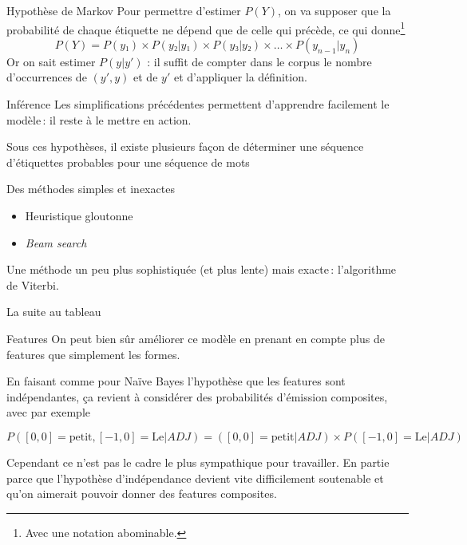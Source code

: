 \documentclass[hyperref={unicode}, xcolor={svgnames}, french]{beamer}
\begin{document}

\begin{frame}{Hypothèse de Markov}
	Pour permettre d'estimer $P(Y)$, on va supposer que la probabilité de chaque étiquette ne dépend que de celle qui précède, ce qui donne\footnote{Avec une notation abominable.}
	\begin{equation}
		P(Y) = P(y₁)×P(y₂|y₁)×P(y₃|y₂)×…×P(y_{n-1}|y_n)
	\end{equation}
	Or on sait estimer $P(y|y')$ : il suffit de compter dans le corpus le nombre d'occurrences de $(y',y)$ et de $y'$ et d'appliquer la définition.
\end{frame}

\begin{frame}{Inférence}
	Les simplifications précédentes permettent d'apprendre facilement le modèle : il reste à le mettre en action.

	Sous ces hypothèses, il existe plusieurs façon de déterminer une séquence d'étiquettes probables pour une séquence de mots

	Des méthodes simples et inexactes
	\begin{itemize}
		\item Heuristique gloutonne
		\item \emph{Beam search}
	\end{itemize}

	Une méthode un peu plus sophistiquée (et plus lente) mais exacte : l'algorithme de Viterbi.
\end{frame}

\begin{frame}[standout]
	La suite au tableau
\end{frame}

\begin{frame}{Features}
	On peut bien sûr améliorer ce modèle en prenant en compte plus de features que simplement les formes.

	En faisant comme pour Naïve Bayes l'hypothèse que les features sont indépendantes, ça revient à considérer des probabilités d'émission composites, avec par exemple

	\begin{equation}
		P([0,0]=\text{petit}, [-1,0]=\text{Le}|ADJ) = ([0,0]=\text{petit}|ADJ)×P([-1,0]=\text{Le}|ADJ)
	\end{equation}

	Cependant ce n'est pas le cadre le plus sympathique pour travailler.
	En partie parce que l'hypothèse d'indépendance devient vite difficilement soutenable et qu'on aimerait pouvoir donner des features composites.
\end{frame}
\end{document}
